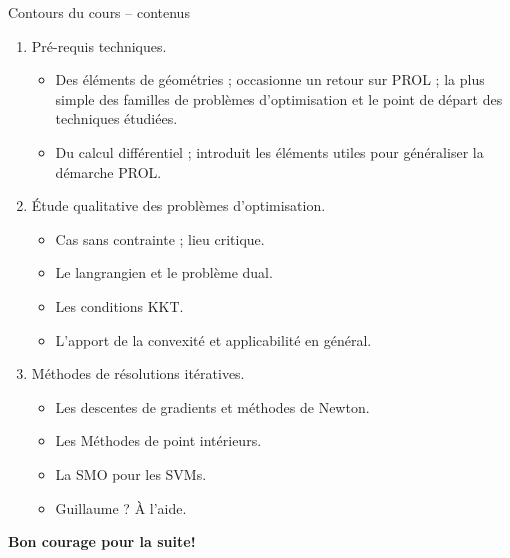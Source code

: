 \documentclass[aspectratio = 169]{beamer}
\begin{document}
\begin{frame}{Contours du cours -- contenus}
\begin{enumerate}
  \item<1->
    Pré-requis techniques.
    \begin{itemize}
    \item Des éléments de géométries ; occasionne un retour sur PROL ;
      la plus simple des familles de problèmes d'optimisation et le
      point de départ des techniques étudiées.
    \item Du calcul différentiel ; introduit les éléments utiles pour
      généraliser la démarche PROL.
    \end{itemize}
  \item<2->
    Étude qualitative des problèmes d'optimisation.
    \begin{itemize}
    \item Cas sans contrainte ; lieu critique.
    \item Le langrangien et le problème dual.
    \item Les conditions KKT.
    \item L'apport de la convexité et applicabilité en général.
    \end{itemize}
  \item<3->
    Méthodes de résolutions itératives.
    \begin{itemize}
    \item Les descentes de gradients et méthodes de Newton.
    \item Les Méthodes de point intérieurs.
    \item La SMO pour les SVMs.
    \item<4-> Guillaume ? À l'aide.
    \end{itemize}
  \end{enumerate}
\end{frame}

\begin{frame}
  \begin{center}
    {\huge \textbf{Bon courage pour la suite!}}
   \end{center}
 \end{frame}

\end{document}
